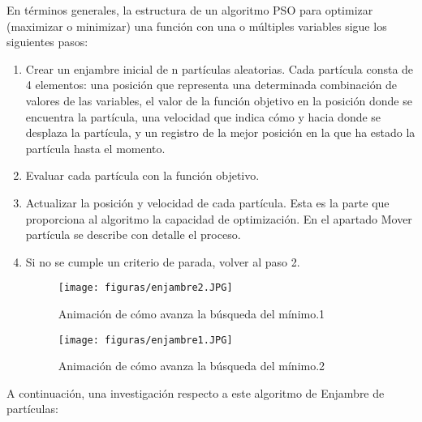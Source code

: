 \documentclass[10pt,conference]{IEEEtran}
\begin{document}
En términos generales, la estructura de un algoritmo PSO para optimizar (maximizar o minimizar) una función con una o múltiples variables sigue los siguientes pasos\citep{Optimiza}:
\begin{enumerate}
    \item Crear un enjambre inicial de n partículas aleatorias. Cada partícula consta de 4 elementos: una posición que representa una determinada combinación de valores de las variables, el valor de la función objetivo en la posición donde se encuentra la partícula, una velocidad que indica cómo y hacia donde se desplaza la partícula, y un registro de la mejor posición en la que ha estado la partícula hasta el momento.
    \item Evaluar cada partícula con la función objetivo.
    \item Actualizar la posición y velocidad de cada partícula. Esta es la parte que proporciona al algoritmo la capacidad de optimización. En el apartado Mover partícula se describe con detalle el proceso.
    \item Si no se cumple un criterio de parada, volver al paso 2.
    
    \begin{figure}[H]
    \begin{center}
       \texttt{[image: figuras/enjambre2.JPG]}
      \caption{Animación de cómo avanza la búsqueda del mínimo.1}
      \label{f1enjambre} 
      \end{center}
    \end{figure} 

    \begin{figure}[H]
    \begin{center}
       \texttt{[image: figuras/enjambre1.JPG]}
      \caption{Animación de cómo avanza la búsqueda del mínimo.2}
      \label{f2enjambre} 
      \end{center}
    \end{figure} 
    
\end{enumerate}
\par A continuación, una investigación respecto a este algoritmo de Enjambre de partículas:
\end{document}
